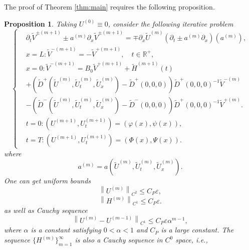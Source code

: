 \documentclass[a4paper,reqno,11pt]{amsart}
\numberwithin{equation}{section} %
\newtheorem{prop}[lem]{Proposition}
\begin{document}
The proof of Theorem \ref{thm:main} requires the following proposition.
\begin{prop}\label{prop:main}
	Taking $U^{(0)}\equiv 0$, consider the following iterative problem
	\begin{equation}
		\begin{cases}
		& \partial_t \widetilde{V}^{ \pm(m+1)} \pm a^{(m)} \partial_x \widetilde{V}^{ \pm(m+1)}=\mp \partial_x \widetilde{U}^{(m)}\left(\partial_t \pm a^{(m)} \partial_x\right)\left(a^{(m)}\right), \\
		& x=L: \widetilde{V}^{-(m+1)}=-\widetilde{V}^{+(m+1)}, \quad t \in \mathbb{R}^{+}, \\
		& x=0: \widetilde{V}^{-(m+1)}=B_0 \widetilde{V}^{+(m+1)}+\widetilde{H}^{(m+1)}(t) \\
		& +\left(\widetilde{D}^{+}\left(\widetilde{U}^{(m)}, \widetilde{U}_t^{(m)}, \widetilde{U}_x^{(m)}\right)-\widetilde{D}^{+}(0,0,0)\right) \widetilde{D}^{+}(0,0,0)^{-1} \widetilde{V}^{-(m)} \\
		& -\left(\widetilde{D}^{-}\left(\widetilde{U}^{(m)}, \widetilde{U}_t^{(m)}, \widetilde{U}_x^{(m)}\right)-\widetilde{D}^{-}(0,0,0)\right) \widetilde{D}^{+}(0,0,0)^{-1} \widetilde{V}^{+(m)}.\\
		& t=0:\left( U^{(m+1)},U^{(m+1)}_t \right) =\left( \varphi  \left( x \right) ,\psi \left( x \right) \right)  ,\\
		& t=T:\left( U^{(m+1)},U^{(m+1)}_t \right) =\left( \varPhi   \left( x \right) ,\varPsi  \left( x \right) \right) .
	\end{cases}	
	\end{equation}
where
$$
a^{(m)}=a\left(\widetilde{U}^{(m)}, \widetilde{U}_t^{(m)}, \widetilde{U}_x^{(m)}\right) .
$$
One can get uniform bounds
\begin{equation}\label{bounds u}
 \left\lVert U^{\left( m \right)}\right\rVert  _{C^2}\leq C_P\varepsilon ,
\end{equation}
\begin{equation}\label{bounds h}
 \left\lVert H^{\left( m \right)}\right\rVert  _{C^1}\leq C_P\varepsilon .
\end{equation}
as well as Cauchy sequence 
\begin{equation}\label{cauchy u}
\left\lVert  U^{\left( m \right)}-U^{\left( m-1 \right)}\right\rVert  _{C^1}\leq C_P\varepsilon \alpha ^{m-1},
\end{equation}
where $\alpha$ is a constant satisfying $0<\alpha <1$ and $C_P$ is a large constant. The sequence $\{H^{(m)}\}_{m=1}^\infty$ is also a Cauchy sequence in $C^0$ space, i.e.,

\end{prop}
\end{document}

